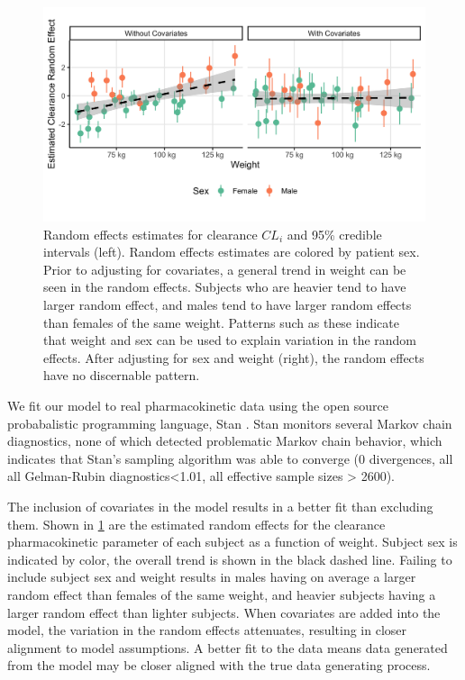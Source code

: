 \begin{figure}
	\centering
	\includegraphics[width=\linewidth]{"figures/random_effects_change.png"}
	\caption{Random effects estimates for clearance $ CL_i $ and 95\% credible intervals (left).  Random effects estimates are colored by patient sex.  Prior to adjusting for covariates, a general trend in weight can be seen in the random effects.  Subjects who are heavier tend to have larger random effect, and males tend to have larger random effects than females of the same weight.  Patterns such as these indicate that weight and sex can be used to explain variation in the random effects.  After adjusting for sex and weight (right), the random effects have no discernable pattern.}
	\label{fig:randomeffectschange}
\end{figure}

We fit our model to real pharmacokinetic data using the open source probabalistic programming language, Stan \cite{gelman2015stan}.  Stan monitors several Markov chain diagnostics, none of which detected problematic Markov chain behavior, which indicates that Stan’s sampling algorithm was able to converge (0 divergences, all all Gelman-Rubin diagnostics<1.01, all effective sample sizes  > 2600).  

The inclusion of covariates in the model results in a better fit than excluding them. Shown in \cref{fig:randomeffectschange} are the estimated random effects for the clearance pharmacokinetic parameter of each subject as a function of weight.  Subject sex is indicated by color, the overall trend is shown in the black dashed line.  Failing to include subject sex and weight results in males having on average a larger random effect than females of the same weight, and heavier subjects having a larger random effect than lighter subjects.  When covariates are added into the model, the variation in the random effects attenuates, resulting in closer alignment to model assumptions. A better fit to the data means data generated from the model may be closer aligned with the true data generating process.

